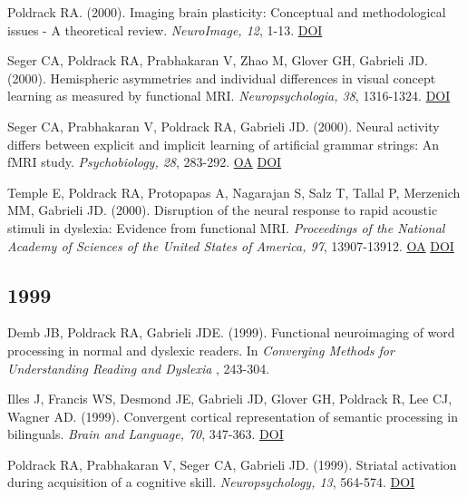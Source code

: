 \documentclass[10pt, letterpaper]{article}
\begin{document}
Poldrack RA.  (2000). Imaging brain plasticity: Conceptual and methodological issues - A theoretical review. \textit{NeuroImage, 12}, 1-13. \href{https://doi.org/10.1006/nimg.2000.0596}{DOI} \vspace{2mm}

Seger CA, Poldrack RA, Prabhakaran V, Zhao M, Glover GH, Gabrieli JD.  (2000). Hemispheric asymmetries and individual differences in visual concept learning as measured by functional MRI. \textit{Neuropsychologia, 38}, 1316-1324. \href{https://doi.org/10.1016/s0028-3932(00)00014-2}{DOI} \vspace{2mm}

Seger CA, Prabhakaran V, Poldrack RA, Gabrieli JD.  (2000). Neural activity differs between explicit and implicit learning of artificial grammar strings: An fMRI study. \textit{Psychobiology, 28}, 283-292. \href{https://doi.org/10.3758/bf03331987}{OA} \href{https://doi.org/10.3758/bf03331987}{DOI} \vspace{2mm}

Temple E, Poldrack RA, Protopapas A, Nagarajan S, Salz T, Tallal P, Merzenich MM, Gabrieli JD.  (2000). Disruption of the neural response to rapid acoustic stimuli in dyslexia: Evidence from functional MRI. \textit{Proceedings of the National Academy of Sciences of the United States of America, 97}, 13907-13912. \href{https://www.ncbi.nlm.nih.gov/pmc/articles/PMC17674}{OA} \href{https://doi.org/10.1073/pnas.240461697}{DOI} \vspace{2mm}

\subsection*{1999}Demb JB, Poldrack RA, Gabrieli JDE.  (1999). Functional neuroimaging of word processing in normal and dyslexic readers. In \textit{Converging Methods for Understanding Reading and Dyslexia }, 243-304. \vspace{2mm}

Illes J, Francis WS, Desmond JE, Gabrieli JD, Glover GH, Poldrack R, Lee CJ, Wagner AD.  (1999). Convergent cortical representation of semantic processing in bilinguals. \textit{Brain and Language, 70}, 347-363. \href{https://doi.org/10.1006/brln.1999.2186}{DOI} \vspace{2mm}

Poldrack RA, Prabhakaran V, Seger CA, Gabrieli JD.  (1999). Striatal activation during acquisition of a cognitive skill. \textit{Neuropsychology, 13}, 564-574. \href{https://doi.org/10.1037/0894-4105.13.4.564}{DOI} \vspace{2mm}
\end{document}
